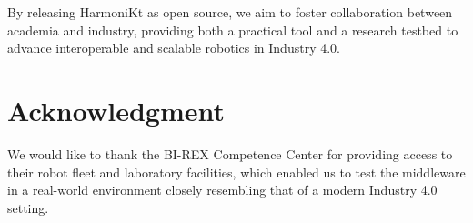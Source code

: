 \documentclass[conference]{IEEEtran}
\begin{document}
By releasing HarmoniKt as open source, 
 we aim to foster collaboration between academia and industry, 
 providing both a practical tool and a research testbed 
 to advance interoperable and scalable robotics in Industry 4.0.


\section*{Acknowledgment}
We would like to thank the BI-REX Competence Center for providing access to their robot fleet and 
 laboratory facilities, which enabled us to test the middleware in a real-world environment closely 
  resembling that of a modern Industry 4.0 setting.




\end{document}
